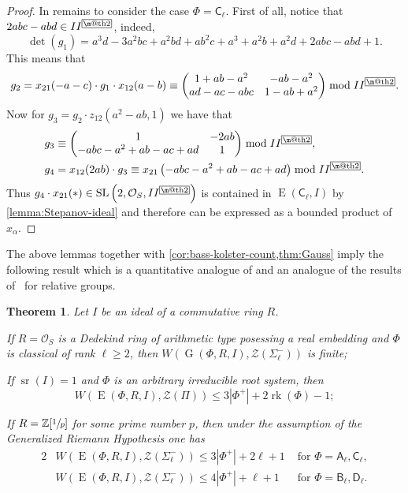 \documentclass[11pt]{amsart}
\makeatletter
\theoremstyle{plain}
\newtheorem{thm}{Theorem}
\numberwithin{equation}{section}
\numberwithin{lemma}{section}
\theoremstyle{definition}
\theoremstyle{remark}
\DeclareMathOperator{\G}{G}
\DeclareMathOperator{\SL}{SL}
\DeclareMathOperator{\E}{E}
\DeclareMathOperator{\sr}{sr}
\DeclareMathOperator{\rk}{rk}
\newcommand{\rA}{\mathsf{A}}
\newcommand{\rB}{\mathsf{B}}
\newcommand{\rC}{\mathsf{C}}
\newcommand{\rD}{\mathsf{D}}
\newcommand{\indexbox}[1]{\text{\fboxsep=.1em\fbox{\m@th$\displaystyle#1$}}}
\makeatother
\begin{document}
\begin{proof}
In remains to consider the case $\Phi=\rC_\ell$. First of all, notice that $2abc-abd\in II^{\indexbox{2}}$, indeed,
\[ \det(g_1)=a^3d-3a^2bc+a^2bd+ab^2c+a^3+a^2b+a^2d+2abc-abd+1. \]
This means that
\[ g_2=x_{21}(-a-c)\cdot g_1\cdot x_{12}(a-b)\equiv
\begin{pmatrix}
1+ab-a^2 & -ab-a^2 \\ ad-ac-abc & 1-ab+a^2
\end{pmatrix}\bmod II^{\indexbox{2}}. \]
Now for $g_3=g_2\cdot z_{12}\left(a^2-ab, 1\right)$ we have that
\begin{align*}
& g_3\equiv\begin{pmatrix} 1 & -2ab \\ -abc-a^2+ab-ac+ad & 1 \end{pmatrix}\bmod II^{\indexbox{2}}, \\
& g_4=x_{12}(2ab)\cdot g_3\equiv x_{21}\left(-abc-a^2+ab-ac+ad\right)\bmod II^{\indexbox{2}}.
\end{align*}
Thus $g_4\cdot x_{21}(*)\in\SL\left(2, \mathcal{O}_S, II^{\indexbox{2}}\right)$ is contained in $\E(\rC_\ell, I)$ by \cref{lemma:Stepanov-ideal} and therefore can be expressed as a bounded product of $x_\alpha$.
\end{proof}
The above lemmas together with \cref{cor:bass-kolster-count,thm:Gauss} imply the following result
 which is a quantitative analogue of \cite[Theorem~3.4]{S} and an analogue of the results of~\cite{VseUnitrZ1p, VavSmSuUnitrEng, Tavgen91} for relative groups.
\begin{thm}\label{thm:width} Let $I$ be an ideal of a commutative ring $R$.
\begin{thmlist}
\item If $R=\mathcal{O}_S$ is a Dedekind ring of arithmetic type posessing a real embedding and $\Phi$ is classical of rank $\ell\geqslant2$, then 
$W(\G(\Phi, R, I), \mathcal{Z}(\Sigma_\ell^-))$ is finite;
\item If $\sr(I) = 1$ and $\Phi$ is an arbitrary irreducible root system, then 
\[W(\E(\Phi, R, I), \mathcal{Z}(\Pi))\leqslant 3|\Phi^+|+2\rk(\Phi)-1;\]
\item If $R = \mathbb{Z}[\sfrac{1}{p}]$ for some prime number $p$, then under the assumption of the Generalized Riemann Hypothesis one has
\begin{alignat*}{2}
& W(\E(\Phi, R, I), \mathcal{Z}(\Sigma_\ell^-))\leqslant 3|\Phi^+| + 2\ell + 1 & \text{ for } \Phi=\rA_\ell, \rC_\ell, \\
& W(\E(\Phi, R, I), \mathcal{Z}(\Sigma_\ell^-))\leqslant 4|\Phi^+| + \ell + 1 & \text{ for } \Phi=\rB_\ell, \rD_\ell.
\end{alignat*}
\end{thmlist}
\end{thm}

\printbibliography
\end{document}
